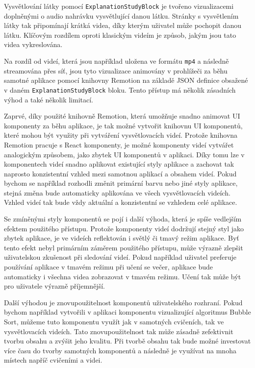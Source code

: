 Vysvětlování látky pomocí \texttt{ExplanationStudyBlock} je tvořeno vizualizacemi doplněnými o audio nahrávku vysvětlující danou látku. Stránky s vysvětlením látky tak připomínají krátká videa, díky kterým uživatel může pochopit danou látku. Klíčovým rozdílem oproti klasickým videím je způsob, jakým jsou tato videa vykreslována.

Na rozdíl od videí, která jsou například uložena ve formátu \texttt{mp4} a následně streamována přes síť, jsou tyto vizualizace animovány v prohlížeči za běhu samotné aplikace pomocí knihovny Remotion na základě JSON definice obsažené v daném \texttt{ExplanationStudyBlock} bloku. Tento přístup má několik zásadních výhod a také několik limitací. %


Zaprvé, díky použité knihovně Remotion, která umožňuje snadno animovat UI komponenty za běhu aplikace, je tak možné vytvořit knihovnu UI komponentů, které mohou být využity při vytváření vysvětlovacích videí. Protože knihovna Remotion pracuje s React komponenty, je možné komponenty videí vytvářet analogickým způsobem, jako zbytek UI komponentů v aplikaci. Díky tomu lze v komponentech videí snadno aplikovat existující styly aplikace a zachovat tak naprosto konzistentní vzhled mezi samotnou aplikací a obsahem videí. Pokud bychom se například rozhodli změnit primární barvu nebo jiné styly aplikace, stejná změna bude automaticky aplikována ve všech vysvětlovacích videích. Vzhled videí tak bude vždy aktuální a konzistentní se vzhledem celé aplikace.

Se zmíněnými styly komponentů se pojí i další výhoda, která je spíše vedlejším efektem použitého přístupu. Protože komponenty videí dodržují stejný styl jako zbytek aplikace, je ve videích reflektován i světlý či tmavý režim aplikace. Byť tento efekt nebyl primárním záměrem použitého přístupu, může výrazně zlepšit uživatelskou zkušenost při sledování videí. Pokud například uživatel preferuje používání aplikace v tmavém režimu při učení se večer, aplikace bude automaticky i všechna videa zobrazovat v tmavém režimu. Učení tak může být pro uživatele výrazně příjemnější.

Další výhodou je znovupoužitelnost komponentů uživatelského rozhraní. Pokud bychom například vytvořili v aplikaci komponentu vizualizující algoritmus Bubble Sort, můžeme tuto komponentu využít jak v samotných cvičeních, tak ve vysvětlovacích videích. Tato znovupoužitelnost tak může zásadně zefektivnit tvorbu obsahu a zvýšit jeho kvalitu. Při tvorbě obsahu tak bude možné investovat více času do tvorby samotných komponentů a následně je využívat na mnoha místech napříč cvičeními a videi.

